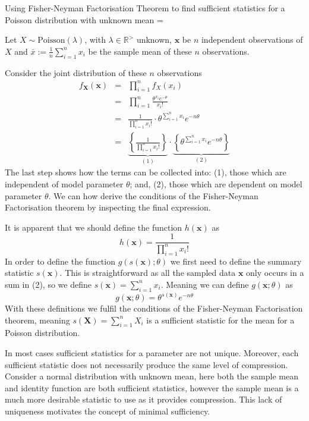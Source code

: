 \documentclass[11pt,a4paper,margin=0]{article}
\theoremstyle{break}
\begin{document}
  \begin{example}{Using Fisher-Neyman Factorisation Theorem to find sufficient statistics for a Poisson distribution with unknown mean}
    \everymath={\displaystyle}
    \par\par Let $X\sim\text{Poisson}(\lambda)$, with $\lambda\in\mathbb{R}^{>}$ unknown, $\mathbf{x}$ be $n$ independent observations of $X$ and $\textstyle\bar{x}:=\frac1n\sum_{i=1}^nx_i$ be the sample mean of these $n$ observations.
    \par Consider the joint distribution of these $n$ observations
    \[\begin{array}{rcl}
      f_{\mathbf{X}}(\mathbf{x})&=&\prod_{i=1}^nf_X(x_i)\\
      &=&\prod_{i=1}^n\frac{\theta^{x_i}e^{-\theta}}{x_i!}\\
      &=&\frac{1}{\prod_{i=1}^nx_i!}\cdot\theta^{\sum_{i=1}^nx_i}e^{-n\theta}\\
      &=&\underbrace{\left\{\frac{1}{\prod_{i=1}^nx_i!}\right\}}_{(1)}\cdot\underbrace{\left\{\theta^{\sum_{i=1}^nx_i}e^{-n\theta}\right\}}_{(2)}
    \end{array}\]
    The last step shows how the terms can be collected into: (1), those which are independent of model parameter $\theta$; and, (2), those which are dependent on model parameter $\theta$. We can how derive the conditions of the Fisher-Neyman Factorisation theorem by inspecting the final expression.
    \par It is apparent that we should define the function $h(\mathbf{x})$ as
    \[ h(\mathbf{x})=\frac1{\prod_{i=1}^nx_i!} \]
    In order to define the function $g(s(\mathbf{x});\theta)$ we first need to define the summary statistic $s(\mathbf{x})$. This is straightforward as all the sampled data $\mathbf{x}$ only occurs in a sum in (2), so we define $\textstyle s(\mathbf{x})=\sum_{i=1}^n x_i$. Meaning we can define $g(\mathbf{x};\theta)$ as
    \[ g(\mathbf{x};\theta)=\theta^{s(\mathbf{x})}e^{-n\theta} \]
    With these definitions we fulfil the conditions of the Fisher-Neyman Factorisation theorem, meaning $s(\mathbf{X})=\sum_{i=1}^nX_i$ is a sufficient statistic for the mean for a Poisson distribution.
  \end{example}

  \par In most cases sufficient statistics for a parameter are not unique. Moreover, each sufficient statistic does not necessarily produce the same level of compression. Consider a normal distribution with unknown mean, here both the sample mean and identity function are both sufficient statistics, however the sample mean is a much more desirable statistic to use as it provides compression. This lack of uniqueness motivates the concept of minimal sufficiency.
\end{document}
